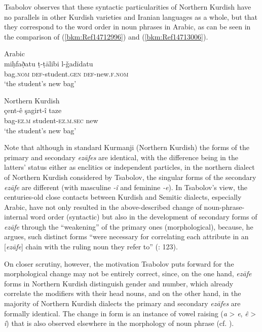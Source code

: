\documentclass[output=paper]{langsci/langscibook}
\begin{document}
Tsabolov observes that these syntactic particularities of Northern Kurdish have no parallels in other Kurdish varieties and Iranian languages as a whole, but that they correspond to the word order in noun phrases in Arabic, as can be seen in the comparison of (\ref{bkm:Ref14712996}) and (\ref{bkm:Ref14713006}). 

\ea\label{bkm:Ref14712996}\label{bkm:Ref14771925}Arabic \citep[123]{Tsabolov1994}\\
\gll miḥfað̣atu ṭ-ṭālibi l-ǧadīdatu\\
     bag\textsc{.nom} \textsc{def}{}-student.\textsc{gen} \textsc{def}{}-new.\textsc{f.nom} \\
\glt ‘the student’s new bag’
\z

\ea\label{bkm:Ref14713006}Northern Kurdish \citep[123]{Tsabolov1994}\\
\gll çent-ê şagirt-î taze\\
     bag-\textsc{ez.m} student-\textsc{ez.m.sec} new\\
\glt ‘the student’s new bag’
\z

Note that although in standard Kurmanji (Northern Kurdish) the forms of the primary and secondary \textit{ezāfes} are identical, with the difference being in the latters’ status either as enclitics or independent particles, in the northern dialect of Northern Kurdish considered by Tsabolov, the singular forms of the secondary \textit{ezāfe} are different (with masculine \textit{{}-î} and feminine \textit{{}-e}). In Tsabolov’s view, the centuries-old close contacts between Kurdish and Semitic dialects, especially Arabic, have not only resulted in the above-described change of noun-phrase-internal word order (syntactic) but also in the development of secondary forms of \textit{ezāfe} through the “weakening” of the primary ones (morphological), because, he argues, such distinct forms “were necessary for correlating each attribute in an [\textit{ezāfe}] chain with the ruling noun they refer to” (\citeyear{Tsabolov1994}: 123). 

On closer scrutiny, however, the motivation Tsabolov puts forward for the morphological change may not be entirely correct, since, on the one hand, \textit{ezāfe} forms in Northern Kurdish distinguish gender and number, which already correlate the modifiers with their head nouns, and on the other hand, in the majority of Northern Kurdish dialects the primary and secondary \textit{ezāfes} are formally identical. The change in form is an instance of vowel raising (\textit{a} > \textit{e}, \textit{ê} > \textit{î}) that is also observed elsewhere in the morphology of noun phrase (cf. \citealt{HaigÖpengin2018}). 
\end{document}
